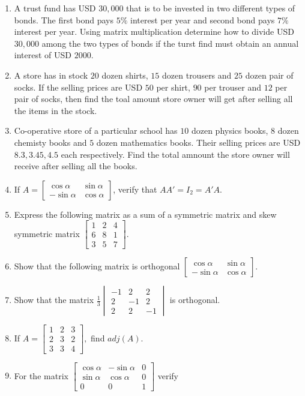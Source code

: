 \begin{enumerate}
\item A trust fund has USD $30,000$ that is to be invested in two different types of bonds. The first bond pays $5\%$ interest per
  year and second bond pays $7\%$ interest per year. Using matrix multiplication determine how to divide USD $30,000$ among the two
  types of bonds if the turst find must obtain an annual interest of USD $2000$.
\item A store has in stock $20$ dozen shirts, $15$ dozen trousers and $25$ dozen pair of socks. If the selling prices are USD $50$
  per shirt, $90$ per trouser and $12$ per pair of socks, then find the toal amount store owner will get after selling all the
  items in the stock.
\item Co-operative store of a particular school has $10$ dozen physics books, $8$ dozen chemisty books and $5$ dozen mathematics
  books. Their selling prices are USD $8.3, 3.45, 4.5$ each respectively. Find the total amnount the store owner will receive after
    selling all the books.
\item If $A = \begin{bmatrix}\cos\alpha & \sin\alpha \\ -\sin\alpha & \cos \alpha\end{bmatrix}$, verify that $AA' = I_2 = A'A$.
\item Express the following matrix as a sum of a symmetric matrix and skew symmetric matrix $\begin{bmatrix}1 & 2 & 4 \\ 6 & 8 & 1
  \\ 3 & 5 & 7\end{bmatrix}$.
\item Show that the following matrix is orthogonal $\begin{bmatrix} \cos\alpha & \sin\alpha \\ -\sin\alpha & \cos\alpha\end{bmatrix}$.
\item Show that the matrix $\frac{1}{3}\begin{vmatrix} -1 & 2 & 2 \\ 2 & -1 & 2 \\ 2 & 2 & -1\end{vmatrix}$ is orthogonal.
\item If $A = \begin{bmatrix}1 & 2 & 3 \\ 2 & 3 & 2 \\ 3 & 3 & 4\end{bmatrix},$ find $adj(A)$.
\item For the matrix $\begin{bmatrix}\cos\alpha & -\sin\alpha & 0 \\\sin\alpha & \cos\alpha & 0 \\ 0 & 0 & 1\end{bmatrix}$ verify

\end{enumerate}
